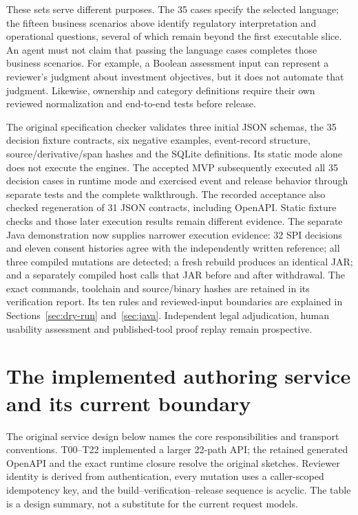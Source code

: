 These sets serve different purposes. The 35 cases specify the selected language;
the fifteen business scenarios above identify regulatory interpretation and
operational questions, several of which remain beyond the first executable
slice. An agent must not claim that passing the language cases completes those
business scenarios. For example, a Boolean assessment input can represent a
reviewer's judgment about investment objectives, but it does not automate that
judgment. Likewise, ownership and category definitions require their own reviewed
normalization and end-to-end tests before release.

The original specification checker validates three initial JSON schemas,
the 35 decision fixture contracts, six negative examples, event-record structure,
source/derivative/span hashes and the SQLite definitions. Its static mode alone
does not execute the engines. The accepted MVP subsequently executed all 35
decision cases in runtime mode and exercised event and release behavior through
separate tests and the complete walkthrough. The recorded acceptance also checked
regeneration of 31 JSON contracts, including OpenAPI. Static fixture checks and
those later execution results remain different evidence. The separate Java
demonstration now supplies narrower execution evidence: 32 SPI decisions and eleven
consent histories agree with the independently written reference; all three
compiled mutations are detected; a fresh rebuild produces an identical JAR;
and a separately compiled host calls that JAR before and after withdrawal.
The exact commands, toolchain and source/binary hashes are retained in its
verification report. Its ten rules and reviewed-input boundaries are explained
in Sections~\ref{sec:dry-run} and~\ref{sec:java}. Independent legal adjudication,
human usability assessment and published-tool proof replay remain prospective.

\section{The implemented authoring service and its current boundary}

The original service design below names the core responsibilities and transport
conventions. T00--T22 implemented a larger 22-path API; the retained generated
OpenAPI and the exact runtime closure resolve the original sketches. Reviewer
identity is derived from authentication, every mutation uses a caller-scoped
idempotency key, and the build--verification--release sequence is acyclic.
The table is a design summary, not a substitute for the current request models.


